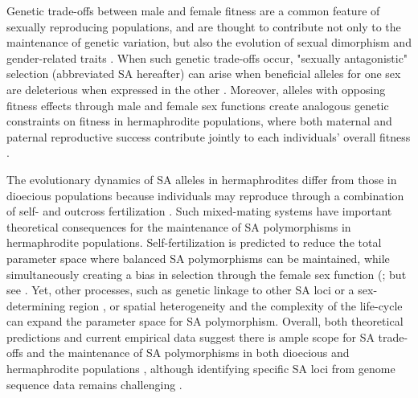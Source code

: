 \documentclass[11pt]{article}
\begin{document}
Genetic trade-offs between male and female fitness are a common feature of sexually reproducing populations, and are thought to contribute not only to the maintenance of genetic variation, but also the evolution of sexual dimorphism and gender-related traits \citep{Lande1980, Rice1992, Charlesworth1999, RiceChippindale2001, BondurianskyChenoweth2009,Olito2019}. When such genetic trade-offs occur, "sexually antagonistic" selection (abbreviated SA hereafter) can arise when beneficial alleles for one sex are deleterious when expressed in the other \citep{Kidwell1977, Rice1992, ConnallonClark2012}. Moreover, alleles with opposing fitness effects through male and female sex functions create analogous genetic constraints on fitness in hermaphrodite populations, where both maternal and paternal reproductive success contribute jointly to each individuals' overall fitness \citep{LloydWebb1986, WebbLloyd1986, Abbott2011, JordanConnallon2014}. 

The evolutionary dynamics of SA alleles in hermaphrodites differ from those in dioecious populations because individuals may reproduce through a combination of self- and outcross fertilization \citep{Goodwillie2005, Igic2006, JarneAuld2006}. Such mixed-mating systems have important theoretical consequences for the maintenance of SA polymorphisms in hermaphrodite populations. Self-fertilization is predicted to reduce the total parameter space where balanced SA polymorphisms can be maintained, while simultaneously creating a bias in selection through the female sex function (\citealt{JordanConnallon2014}; but see \citealt{Tazzyman2015}. Yet, other processes, such as genetic linkage to other SA loci or a sex-determining region \citep{Otto2011, JordanCharlesworth2012, Olito2017, Olito2019}, or spatial heterogeneity and the complexity of the life-cycle \citep{Olito-etal-2018,ConnallonSharmaOlito2019} can expand the parameter space for SA polymorphism. Overall, both theoretical predictions and current empirical data suggest there is ample scope for SA trade-offs and the maintenance of SA polymorphisms in both dioecious and hermaphrodite populations \citep{Abbott2011, WangBarrett2020}, although identifying specific SA loci from genome sequence data remains challenging \citep{RuzickaESEB2020}.
\bigskip
\end{document}
